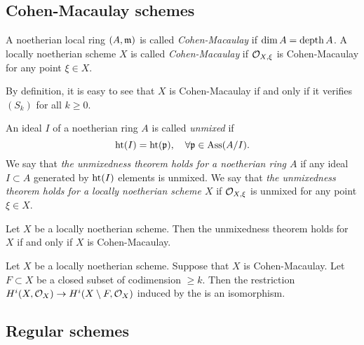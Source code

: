 \subsection{Cohen-Macaulay schemes}

    \begin{definition}
        A noetherian local ring $(A,{\mathfrak{m}})$ is called \textit{Cohen-Macaulay} if $\dim A = \operatorname{depth} A$.
        A locally noetherian scheme $X$ is called \textit{Cohen-Macaulay} if ${\mathcal{O}}_{X,\xi}$ is Cohen-Macaulay for any point $\xi \in X$.
    \end{definition}

    By definition, it is easy to see that $X$ is Cohen-Macaulay if and only if it verifies $(S_k)$ for all $k \geq 0$.

    \begin{example}

    \end{example}

    \begin{definition}
        An ideal $I$ of a noetherian ring $A$ is called \textit{unmixed} if 
        \[ \operatorname{ht}(I) = \operatorname{ht}({\mathfrak{p}}), \quad \forall {\mathfrak{p}} \in \operatorname{Ass}(A/I). \]
        We say that \textit{the unmixedness theorem holds for a noetherian ring $A$} if any ideal $I \subset A$ generated by $\operatorname{ht}(I)$ elements is unmixed.
        We say that \textit{the unmixedness theorem holds for a locally noetherian scheme $X$} if ${\mathcal{O}}_{X,\xi}$ is unmixed for any point $\xi \in X$.
    \end{definition}

    \begin{theorem}
        Let $X$ be a locally noetherian scheme.
        Then the unmixedness theorem holds for $X$ if and only if $X$ is Cohen-Macaulay.
    \end{theorem}

    \begin{theorem}
        Let $X$ be a locally noetherian scheme.
        Suppose that $X$ is Cohen-Macaulay.
        Let $F \subset X$ be a closed subset of codimension $\geq k$.
        Then the restriction $H^i(X,{\mathcal{O}}_X) \to H^i(X\setminus F, {\mathcal{O}}_{X})$ induced by the 
         is an isomorphism.
    \end{theorem}


    
\subsection{Regular schemes}

